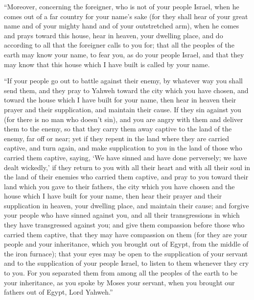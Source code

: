  ``Moreover, concerning the foreigner, who is not of your
people Israel, when he comes out of a far country for your name's sake
 (for they shall hear of your great name and of your
mighty hand and of your outstretched arm), when he comes and prays
toward this house,  hear in heaven, your dwelling place,
and do according to all that the foreigner calls to you for; that all
the peoples of the earth may know your name, to fear you, as do your
people Israel, and that they may know that this house which I have built
is called by your name.

 ``If your people go out to battle against their enemy,
by whatever way you shall send them, and they pray to Yahweh toward the
city which you have chosen, and toward the house which I have built for
your name,  then hear in heaven their prayer and their
supplication, and maintain their cause.  If they sin
against you (for there is no man who doesn't sin), and you are angry
with them and deliver them to the enemy, so that they carry them away
captive to the land of the enemy, far off or near;  yet
if they repent in the land where they are carried captive, and turn
again, and make supplication to you in the land of those who carried
them captive, saying, `We have sinned and have done perversely; we have
dealt wickedly,'  if they return to you with all their
heart and with all their soul in the land of their enemies who carried
them captive, and pray to you toward their land which you gave to their
fathers, the city which you have chosen and the house which I have built
for your name,  then hear their prayer and their
supplication in heaven, your dwelling place, and maintain their cause;
 and forgive your people who have sinned against you, and
all their transgressions in which they have transgressed against you;
and give them compassion before those who carried them captive, that
they may have compassion on them  (for they are your
people and your inheritance, which you brought out of Egypt, from the
middle of the iron furnace);  that your eyes may be open
to the supplication of your servant and to the supplication of your
people Israel, to listen to them whenever they cry to you.
 For you separated them from among all the peoples of the
earth to be your inheritance, as you spoke by Moses your servant, when
you brought our fathers out of Egypt, Lord Yahweh.''

